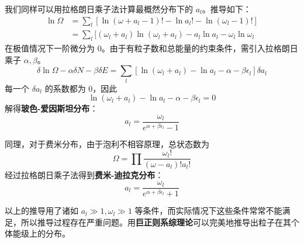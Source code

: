 我们同样可以用拉格朗日乘子法计算最概然分布下的 $a_l$。推导如下：
\begin{equation}
\begin{aligned}
\ln \Omega&=\sum_l[\ln (\omega+a_l-1)!-\ln a_l!-\ln (\omega_l-1)!]\\
&=\sum_l[(\omega_l+a_l)\ln(\omega_l+a_l)-a_l\ln a_l-\omega_l\ln \omega_l
\end{aligned}
\end{equation}
在极值情况下一阶微分为 $0$。由于有粒子数和总能量的约束条件，需引入拉格朗日乘子 $\alpha,\beta$。
\begin{equation}
\delta \ln \Omega-\alpha\delta N-\beta\delta E=\sum_l[\ln (\omega_l+a_l)-\ln a_l-\alpha-\beta\epsilon_l]\delta a_l
\end{equation}
每一个 $\delta a_l$ 的系数都为 $0$，因此
\begin{equation}
\ln(\omega_l+a_l)-\ln a_l-\alpha-\beta \epsilon_l=0
\end{equation}
解得\textbf{玻色-爱因斯坦分布}：
\begin{equation}
a_l=\frac{\omega_l}{e^{\alpha+\beta\epsilon_l}-1}
\end{equation}

同理，对于费米分布，由于泡利不相容原理，总状态数为
\begin{equation}
\Omega=\prod \frac{\omega_l!}{(\omega-a_l)!a_l!}
\end{equation}
经过拉格朗日乘子法得到\textbf{费米-迪拉克分布}：
\begin{equation}
a_l=\frac{\omega_l}{e^{\alpha+\beta\epsilon_l}+1}
\end{equation}

以上的推导用了诸如 $a_l\gg 1,\omega_l\gg 1$ 等条件，而实际情况下这些条件常常不能满足，所以推导过程存在严重问题。用\textbf{巨正则系综理论}可以完美地推导出粒子在其个体能级上的分布。

